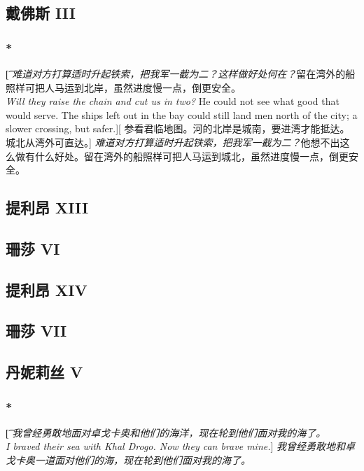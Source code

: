 \documentclass[12pt,a4paper]{article}
\begin{document}
\subsection{戴佛斯 III}

\subsubsection{\color{red}*}\t[
	\emph{难道对方打算适时升起铁索，把我军一截为二？这样做好处何在？}留在湾外的船照样可把人马运到北岸，虽然进度慢一点，倒更安全。\\
	\emph{Will they raise the chain and cut us in two?} He could not see what good that would serve. The ships left out in the bay could still land men north of the city; a slower crossing, but safer.][
	参看君临地图。河的北岸是城南，要进湾才能抵达。城北从湾外可直达。]
	\emph{难道对方打算适时升起铁索，把我军一截为二？}他想不出这么做有什么好处。留在湾外的船照样可把人马运到城北，虽然进度慢一点，倒更安全。
	
\subsection{提利昂 XIII}

\subsection{珊莎 VI}

\subsection{提利昂 XIV}

\subsection{珊莎 VII}

\subsection{丹妮莉丝 V}

\subsubsection{\color{red}*}\t[
	\emph{我曾经勇敢地面对卓戈卡奥和他们的海洋，现在轮到他们面对我的海了。}\\
	\emph{I braved their sea with Khal Drogo. Now they can brave mine.}]
	\emph{我曾经勇敢地和卓戈卡奥一道面对他们的海，现在轮到他们面对我的海了。}
	
\end{document}
